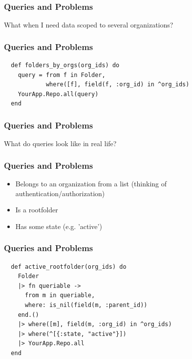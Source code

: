 \documentclass{beamer}
\begin{document}

\begin{frame}[fragile]
\frametitle{Queries and Problems}
\centerline{What when I need data scoped to several organizations?}
\end{frame}


\begin{frame}[fragile]
\frametitle{Queries and Problems}
\begin{verbatim}
  def folders_by_orgs(org_ids) do
    query = from f in Folder,
            where([f], field(f, :org_id) in ^org_ids)
    YourApp.Repo.all(query)
  end
\end{verbatim}
\end{frame}


\begin{frame}[fragile]
\frametitle{Queries and Problems}
\centerline{What do queries look like in real life?}
\end{frame}


\begin{frame}[fragile]
\frametitle{Queries and Problems}
\begin{itemize}
\item Belongs to an organization from a list (thinking of authentication/authorization)
\item Is a rootfolder
\item Has some state (e.g. 'active')
\end{itemize}
\end{frame}


\begin{frame}[fragile]
\frametitle{Queries and Problems}
\begin{verbatim}
  def active_rootfolder(org_ids) do
    Folder
    |> fn queriable ->
      from m in queriable,
      where: is_nil(field(m, :parent_id))
    end.()
    |> where([m], field(m, :org_id) in ^org_ids)
    |> where(^[{:state, "active"}])
    |> YourApp.Repo.all
  end
\end{verbatim}
\end{frame}

\end{document}
